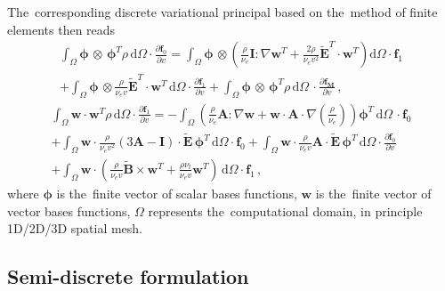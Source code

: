\documentclass[review]{elsarticle}
\newcommand{\pdv}[2]{\frac{\partial{#1}}{\partial{#2}}}
\newcommand{\vect}[1]{\boldsymbol{#1}}
\newcommand{\matr}[1]{\mathbf{#1}}
\newcommand{\dI}{\text{d}}
\newcommand{\nue}{\nu_{e}}
\newcommand{\nutot}{\nu_{t}}
\newcommand{\vmag}{v}
\newcommand{\B}{\vect{B}}
\newcommand{\tE}{\vect{\tilde{E}}}
\newcommand{\fM}{f_M}
\newcommand{\vfzero}{\vect{f}_0}
\newcommand{\fone}{\vect{f}_1}
\newcommand{\MI}{\matr{I}}
\newcommand{\MA}{\matr{A}}
\newcommand{\intO}{\int_{\Omega}}
\begin{document}
The~corresponding discrete variational principal based on the~method of 
finite elements then reads
\begin{multline}
  \intO\vect{\phi}\, \otimes\, \vect{\phi}^T 
  \rho\, \dI \Omega \cdot \pdv{\vfzero}{\vmag} = 
  \intO\vect{\phi}\, \otimes \left(
  \frac{\rho}{\nue}\MI:\nabla\matr{w}^T + 
  \frac{2 \rho}{\nue\vmag^2}\tE^T \cdot\matr{w}^T \right)\dI \Omega
  \cdot \fone \\
  + \intO\vect{\phi}\, \otimes
  \frac{\rho}{\nue\vmag}\tE^T \cdot \matr{w}^T\, \dI \Omega 
  \cdot \pdv{\fone}{\vmag} + 
  \intO\vect{\phi}\, \otimes\, \vect{\phi}^T \rho\, \dI\Omega\,
  \cdot \pdv{\vect{\fM}}{\vmag}
  \, , 
  \label{eq:FEM1hosf0}
\end{multline}
\begin{multline}
  \intO\matr{w} \cdot \matr{w}^T \rho\, \dI\Omega \cdot 
  \pdv{\fone}{\vmag} =
  - \intO
  \left(\frac{\rho}{\nue} \MA : \nabla\matr{w} 
  + \matr{w} \cdot \MA \cdot \nabla\left(\frac{\rho}{\nue}\right)\right)
  \vect{\phi}^T\, \dI \Omega\, 
  \cdot \vfzero \\
  + \intO\matr{w} \cdot 
  \frac{\rho}{\nue\vmag^2} \left( 3\MA - \MI \right) \cdot \tE\,  
  \vect{\phi}^T\, \dI\Omega \cdot \vfzero 
  + \intO\matr{w} \cdot
  \frac{\rho}{\nue\vmag} \MA \cdot \tE\, \vect{\phi}^T\, \dI \Omega 
  \cdot \pdv{\vfzero}{\vmag}\\
  + \intO\matr{w} \cdot
  \left(\frac{\rho}{\nue\vmag}\tilde{\B}\times\matr{w}^T + 
  \frac{\rho \nutot}{\nue\vmag} \matr{w}^T\right)\, \dI\Omega 
  \cdot \fone\, ,
  \label{eq:FEM1hosf1}
\end{multline}
where $\vect{\phi}$ is the~finite vector of scalar bases functions, 
$\matr{w}$ is the~finite vector of vector bases functions,
$\Omega$ represents the~computational domain, in principle 1D/2D/3D 
spatial mesh. 

\subsection{Semi-discrete formulation}\label{sec:semidiscrete_form}
\end{document}
